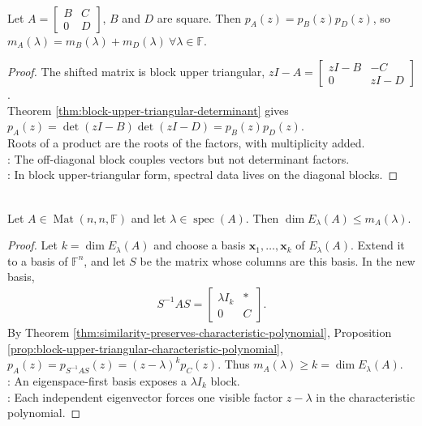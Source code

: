 \begin{proposition} \label{prop:block-upper-triangular-characteristic-polynomial} \\
Let $A=
\begin{bmatrix}
B & C\\
0 & D
\end{bmatrix}$, $B$ and $D$ are square. Then $p_A(z)=p_B(z)p_D(z)$, so $m_A(\lambda)=m_B(\lambda)+m_D(\lambda) \ \forall\lambda\in\mathbb{F}$.
\begin{proof}
The shifted matrix is block upper triangular, $zI-A=
\begin{bmatrix}
zI-B & -C\\
0 & zI-D \end{bmatrix}$.\\
Theorem \ref{thm:block-upper-triangular-determinant} gives $p_A(z)=\det(zI-B)\det(zI-D)=p_B(z)p_D(z)$.\\
Roots of a product are the roots of the factors, with multiplicity added.\\
: The off-diagonal block couples vectors but not determinant factors.\\
: In block upper-triangular form, spectral data lives on the diagonal blocks.
\end{proof}
\end{proposition}

\begin{theorem} \label{thm:geometric-multiplicity-bounded-by-algebraic-multiplicity} \\
Let $A\in\operatorname{Mat}(n,n,\mathbb{F})$ and let $\lambda\in\operatorname{spec}(A)$. Then $\dim E_{\lambda}(A)\leq m_A(\lambda)$.
\begin{proof}
Let $k=\dim E_{\lambda}(A)$ and choose a basis $\mathbf{x}_1,\ldots,\mathbf{x}_k$ of $E_{\lambda}(A)$. Extend it to a basis of $\mathbb{F}^n$, and let $S$ be the matrix whose columns are this basis. In the new basis,
\begin{align}
S^{-1}AS=
\begin{bmatrix}
\lambda I_k & *\\
0 & C
\end{bmatrix}.
\nonumber
\end{align}
By Theorem \ref{thm:similarity-preserves-characteristic-polynomial}, Proposition \ref{prop:block-upper-triangular-characteristic-polynomial}, $p_A(z)=p_{S^{-1}AS}(z)=(z-\lambda)^kp_C(z)$. Thus $m_A(\lambda)\geq k=\dim E_{\lambda}(A)$.\\
: An eigenspace-first basis exposes a $\lambda I_k$ block.\\
: Each independent eigenvector forces one visible factor $z-\lambda$ in the characteristic polynomial.
\end{proof}
\end{theorem}

